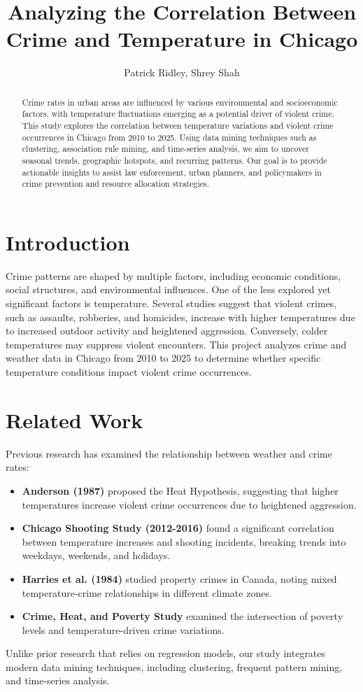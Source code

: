\documentclass[sigconf]{acmart}
\title{Analyzing the Correlation Between Crime and Temperature in Chicago}
\author{Patrick Ridley, Shrey Shah}
\affiliation{
  \institution{University of Colorado Boulder}
  \city{Boulder}
  \state{CO}
  \country{USA}
}
\begin{document}
\maketitle

\begin{abstract}
Crime rates in urban areas are influenced by various environmental and socioeconomic factors, with temperature fluctuations emerging as a potential driver of violent crime. This study explores the correlation between temperature variations and violent crime occurrences in Chicago from 2010 to 2025. Using data mining techniques such as clustering, association rule mining, and time-series analysis, we aim to uncover seasonal trends, geographic hotspots, and recurring patterns. Our goal is to provide actionable insights to assist law enforcement, urban planners, and policymakers in crime prevention and resource allocation strategies.
\end{abstract}

\section{Introduction}
Crime patterns are shaped by multiple factors, including economic conditions, social structures, and environmental influences. One of the less explored yet significant factors is temperature. Several studies suggest that violent crimes, such as assaults, robberies, and homicides, increase with higher temperatures due to increased outdoor activity and heightened aggression. Conversely, colder temperatures may suppress violent encounters. This project analyzes crime and weather data in Chicago from 2010 to 2025 to determine whether specific temperature conditions impact violent crime occurrences.

\section{Related Work}
Previous research has examined the relationship between weather and crime rates:
\begin{itemize}
    \item \textbf{Anderson (1987)} proposed the Heat Hypothesis, suggesting that higher temperatures increase violent crime occurrences due to heightened aggression.
    \item \textbf{Chicago Shooting Study (2012-2016)} found a significant correlation between temperature increases and shooting incidents, breaking trends into weekdays, weekends, and holidays.
    \item \textbf{Harries et al. (1984)} studied property crimes in Canada, noting mixed temperature-crime relationships in different climate zones.
    \item \textbf{Crime, Heat, and Poverty Study} examined the intersection of poverty levels and temperature-driven crime variations.
\end{itemize}
Unlike prior research that relies on regression models, our study integrates modern data mining techniques, including clustering, frequent pattern mining, and time-series analysis.
\end{document}

